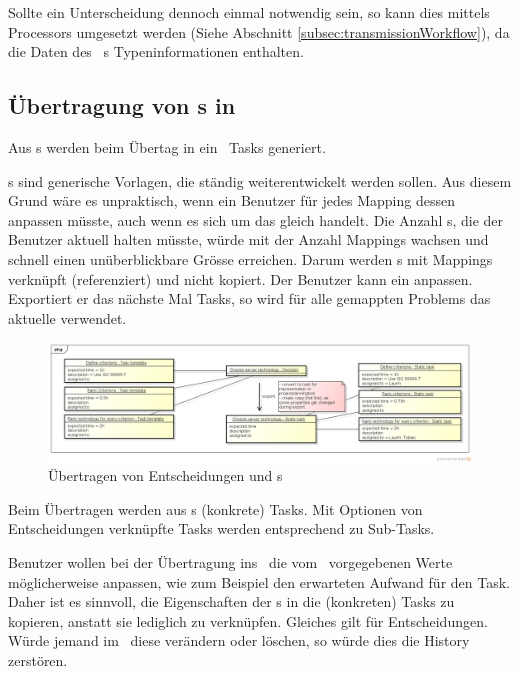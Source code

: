 				Sollte ein Unterscheidung dennoch einmal notwendig sein, 
				so kann dies mittels Processors umgesetzt werden (Siehe Abschnitt \ref{subsec:transmissionWorkflow}), da die Daten des \dks\ s Typeninformationen enthalten.
				

			\subsection{Übertragung von \ttpl s in \ppt}
				Aus \ttpl s werden beim Übertag in ein \ppt\ Tasks generiert.
								
				\ttpl s sind generische Vorlagen, die ständig weiterentwickelt werden sollen.
				Aus diesem Grund wäre es unpraktisch, wenn ein Benutzer für jedes Mapping dessen \ttpl anpassen müsste, auch wenn es sich um das gleich \ttpl handelt.
				Die Anzahl \ttpl s, die der Benutzer aktuell halten müsste, würde mit der Anzahl Mappings wachsen und schnell einen unüberblickbare Grösse erreichen.
				Darum werden \ttpl s mit Mappings verknüpft (referenziert) und nicht kopiert.
				Der Benutzer kann ein \ttpl anpassen. Exportiert er das nächste Mal Tasks, 
				so wird für alle gemappten Problems das aktuelle \ttpl verwendet.
				
				\begin{figure}[H]
					\includegraphics[width=\textwidth]{architecture/media/img/decisionTaskRelation.png}
					\centering
					\caption{Übertragen von Entscheidungen und \ttpl s}
					\label{fig:DecisionTaskRelation}
				\end{figure}
				
				Beim Übertragen werden aus \ttpl s (konkrete) Tasks.
				Mit Optionen von Entscheidungen verknüpfte Tasks werden entsprechend zu Sub-Tasks.
				
				Benutzer wollen bei der Übertragung ins \ppt\ die vom \ttpl\ vorgegebenen Werte möglicherweise anpassen, wie zum Beispiel den erwarteten Aufwand für den Task.
				Daher ist es sinnvoll, die Eigenschaften der \ttpl s in die (konkreten) Tasks zu kopieren, anstatt sie lediglich zu verknüpfen.
				Gleiches gilt für Entscheidungen. Würde jemand im \dks\ diese verändern oder löschen,
				so würde dies die History zerstören.
			
